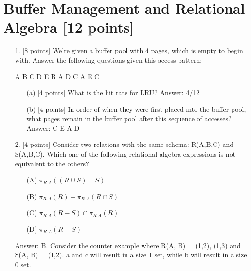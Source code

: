 \documentclass[10pt]{article}
\begin{document}

\section{\textbf{Buffer Management and Relational Algebra [12 points]}}
\begin{enumerate}
    \item[1.] [8 points] We’re given a buffer pool with 4 pages, which is empty to begin with. Answer the following questions given
this access pattern:
\begin{center}
A B C D E B A D C A E C
\end{center}
\begin{enumerate}
    \item[(a)] [4 points] What is the hit rate for LRU? {\quad\color{red}Answer: 4/12}
    \item[(b)][4 points] In order of when they were first placed into the buffer pool, what pages remain in the buffer pool after this sequence of accesses?{\quad\color{red}Answer: C E A D}
\end{enumerate}
    \item[2.] [4 points] Consider two relations with the same schema: R(A,B,C) and S(A,B,C). Which one of the following relational
algebra expressions is not equivalent to the others?
\begin{enumerate}
\item[(A)] $\pi_{R.A}((R\cup S)-S)$
\item[(B)] $\pi_{R.A}(R)-\pi_{R.A}(R\cap S)$
\item[(C)] $\pi_{R.A}(R-S)\cap \pi_{R.A}(R)$
\item[(D)] $\pi_{R.A}(R-S)$
\end{enumerate}
{\color{red} Answer: B. Consider the counter example where R(A, B) = (1,2), (1,3) and S(A, B) = (1,2). a and c
will result in a size 1 set, while b will result in a size 0 set.}
\end{enumerate}
\end{document}
